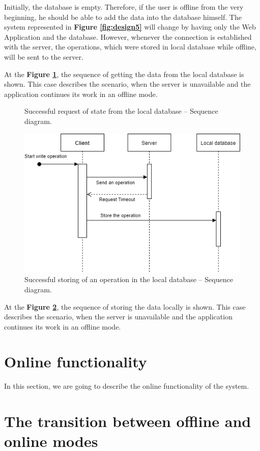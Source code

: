 Initially, the database is empty. Therefore, if the user is offline from the very beginning, he should be able to add the data into the database himself. 
The system represented in \textbf{Figure \ref{fig:design5}} will change by having only the Web Application and the database. However, whenever the connection is established with the server, the operations, which were stored in local database while offline, will be sent to the server. 

At the \textbf{Figure \ref{fig:design6}}, the sequence of getting the data from the local database is shown. This case describes the scenario, when the server is unavailable and the application continues its work in an offline mode.
 
\begin{figure}[!htb]
    \begin{center}
    \def\svgwidth{\columnwidth}
    
    \caption {Successful request of state from the local database -- Sequence diagram.}
    \label{fig:design6}
\end{center}
\end{figure}

\begin{figure}[!htb]
    \begin{center}
    \includegraphics[width=\linewidth]{images/design/offlineProtocol_send.png}%
    \caption {Successful storing of an operation in the local database -- Sequence diagram.}
    \label{fig:design7}
\end{center}
\end{figure}

At the \textbf{Figure \ref{fig:design7}}, the sequence of storing the data locally is shown. This case describes the scenario, when the server is unavailable and the application continues its work in an offline mode.


\section {Online functionality}

In this section, we are going to describe the online functionality of the system.



\section {The transition between offline and online modes}